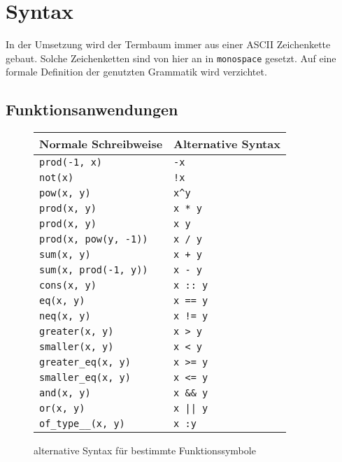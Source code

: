 \section{Syntax} \label{subsecSyntax}
In der Umsetzung wird der Termbaum immer aus einer ASCII Zeichenkette gebaut.
Solche Zeichenketten sind von hier an in \texttt{monospace} gesetzt. Auf eine formale Definition der genutzten Grammatik wird verzichtet.

\subsection{Funktionsanwendungen}
\begin{figure}
    \centering
    \begin{tabular}{l l}
        \hline
        Normale Schreibweise & Alternative Syntax\\
        \hline \hline
        \verb|prod(-1, x)|         & \verb|-x|\\
        \verb|not(x)|              & \verb|!x|\\
        \verb|pow(x, y)|           & \verb|x^y|\\
        \verb|prod(x, y)|          & \verb|x * y|\\
        \verb|prod(x, y)|          & \verb|x y|\\
        \verb|prod(x, pow(y, -1))| & \verb|x / y|\\
        \verb|sum(x, y)|           & \verb|x + y|\\
        \verb|sum(x, prod(-1, y))| & \verb|x - y|\\
        \verb|cons(x, y)|          & \verb|x :: y|\\
        \verb|eq(x, y)|            & \verb|x == y|\\
        \verb|neq(x, y)|           & \verb|x != y|\\
        \verb|greater(x, y)|       & \verb|x > y|\\
        \verb|smaller(x, y)|       & \verb|x < y|\\
        \verb|greater_eq(x, y)|    & \verb|x >= y|\\
        \verb|smaller_eq(x, y)|    & \verb|x <= y|\\
        \verb|and(x, y)|           & \verb|x && y|\\
        \verb|or(x, y)|            & \verb!x || y!\\
        \verb|of_type__(x, y)|     & \verb|x :y|\\
        \hline
    \end{tabular}
    \caption{alternative Syntax für bestimmte Funktionssymbole}
    \label{tabZucker}
\end{figure}


